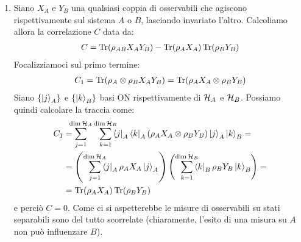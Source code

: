 \documentclass[../../InformazioneQuantistica.tex]{subfiles}
\begin{document}
\begin{enumerate}
\item Siano $X_A$ e $Y_B$ una qualsiasi coppia di osservabili che agiscono rispettivamente sul sistema $A$ o $B$, lasciando invariato l'altro. Calcoliamo allora la correlazione $C$ data da:
\begin{align*}
   C = \operatorname{Tr}(\rho_{AB} X_A Y_B) - \operatorname{Tr}(\rho_A X_A) \operatorname{Tr}(\rho_B Y_B)
\end{align*}
Focalizziamoci sul primo termine:
\begin{align*}
    C_1 = \operatorname{Tr}(\rho_A \otimes \rho_B X_A Y_B) = \operatorname{Tr}(\rho_A X_A \otimes \rho_B Y_B)
\end{align*}
Siano $\{\Ket{j}_A\}$ e $\{\Ket{k}_B\}$ basi ON rispettivamente di $\mathcal{H}_A$ e $\mathcal{H}_B$. Possiamo quindi calcolare la traccia come:
\begin{align*}
    C_1 &= \smashoperator[l]{\sum_{j=1}^{\op{dim}\hs_A}} \smashoperator[r]{\sum_{k=1}^{\op{dim}\hs_B}} \bra{j}_A\bra{k}_A (\rho_A X_A \otimes \rho_B Y_B) \ket{j}_A \ket{k}_B = \\
    &= \left( \smashoperator[r]{\sum_{j=1}^{\op{dim}\hs_A}} \bra{j}_A \rho_A X_A \ket{j}_A \right) \left( \smashoperator[r]{\sum_{k=1}^{\op{dim}\hs_B}} \bra{k}_B \rho_B Y_B \ket{k}_B \right) =\\
    &= \op{Tr}(\rho_A X_A) \op{Tr}(\rho_B Y_B)
\end{align*}
e perciò $C=0$. Come ci si aspetterebbe le misure di osservabili su stati separabili sono del tutto scorrelate (chiaramente, l'esito di una misura su $A$ non può influenzare $B$).

\end{enumerate}
\end{document}
